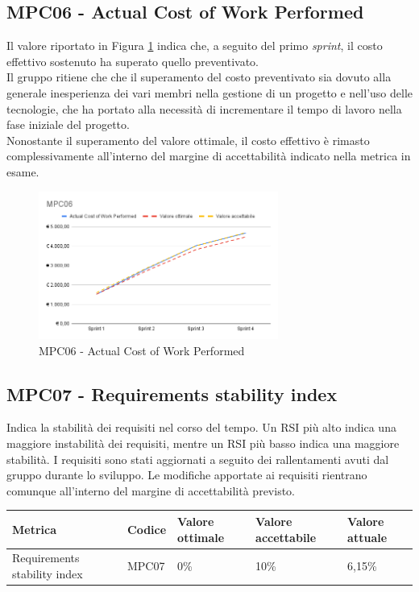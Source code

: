 \subsection{MPC06 - Actual Cost of Work Performed}
\label{s:mpc06}
Il valore riportato in Figura \ref{fig:mpc06} indica che, a seguito del primo \textit{sprint}, il costo effettivo sostenuto ha superato quello preventivato.\\
Il gruppo ritiene che che il superamento del costo preventivato sia dovuto alla generale inesperienza dei vari membri nella gestione di un progetto e nell'uso delle tecnologie, che ha portato alla necessità di incrementare il tempo di lavoro nella fase iniziale del progetto.\\
Nonostante il superamento del valore ottimale, il costo effettivo è rimasto complessivamente all'interno del margine di accettabilità indicato nella metrica in esame.

\begin{figure}[htbp]
    \centering
    \includegraphics[width=0.7\textwidth]{img/MPC06.png}
    \caption{MPC06 - Actual Cost of Work Performed}
    \label{fig:mpc06}
\end{figure}


\subsection{MPC07 - Requirements stability index}
\label{s:mpc07}
Indica la stabilità dei requisiti nel corso del tempo.
Un RSI più alto indica una maggiore instabilità dei requisiti, mentre un RSI più basso indica una maggiore stabilità.
I requisiti sono stati aggiornati a seguito dei rallentamenti avuti dal gruppo durante lo sviluppo.
Le modifiche apportate ai requisiti rientrano comunque all'interno del margine di accettabilità previsto.
\begin{table}[H]
    \centering
    \begin{tabularx}{\textwidth}{p{5.5cm}|X|l|l|l}
        \hline
		\textbf{Metrica} & \textbf{Codice} & \textbf{Valore ottimale} & \textbf{Valore accettabile}  & \textbf{Valore attuale} \\
        \hline
        Requirements stability index  & MPC07 & 0\% & 10\% & 6,15\% \\
    \end{tabularx}
\end{table}


